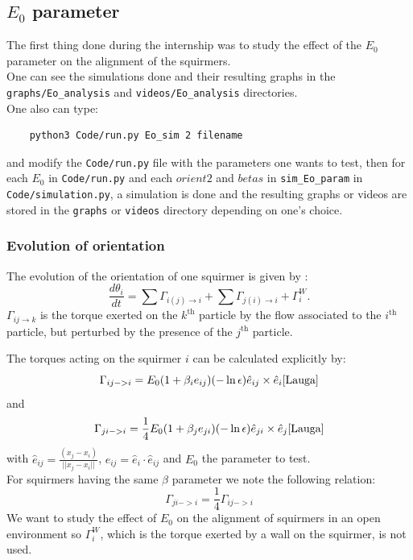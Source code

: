 \documentclass{article}
\begin{document}
\subsection{$E_0$ parameter}
The first thing done during the internship was to study the effect of the $E_0$ parameter on the alignment of the squirmers.\\
One can see the simulations done and their resulting graphs in the \texttt{graphs/Eo\_analysis} and \texttt{videos/Eo\_analysis} directories.\\
One also can type:
\begin{verbatim}
    python3 Code/run.py Eo_sim 2 filename
\end{verbatim}
and modify the \texttt{Code/run.py} file with the parameters one wants to test,
 then for each $E_0$ in \texttt{Code/run.py} and each $orient2$ and $betas$ in \texttt{sim\_Eo\_param} in \texttt{Code/simulation.py}, 
 a simulation is done and the resulting graphs or videos are stored in the \texttt{graphs} or \texttt{videos} 
 directory depending on one's choice.\\

\subsubsection{Evolution of orientation}
The evolution of the orientation of one squirmer is given by : 
$$
\frac{d \theta_i}{dt} = \sum \Gamma_{i(j)\rightarrow i} + \sum \Gamma_{j(i)\rightarrow i} +  \Gamma_{i}^W.
$$
$\Gamma_{ij\rightarrow k}$ is the torque exerted on the $k^\mathrm{th}$ particle by the flow associated to the $i^\mathrm{th}$ particle, but perturbed by the presence of the $j^\mathrm{th}$ particle.\\

\vspace{0.5cm}

The torques acting on the squirmer $i$ can be calculated explicitly by: \\
$$
\Gamma_{ij->i} = E_0(1 + \beta_i e_{ij})(-\ln\epsilon)\hat{e}_{ij}\times \hat{e}_i \cite{Lauga}
$$
and
$$
\Gamma_{ji->i} = \frac{1}{4}E_0(1 + \beta_j e_{ji})(-\ln\epsilon)\hat{e}_{ji}\times \hat{e}_j \cite{Lauga}
$$
with $\hat{e}_{ij} = \frac{(x_j - x_i)}{||x_j - x_i||}$, $e_{ij} = \hat{e}_i\cdot \hat{e}_{ij}$ and $E_0$ the parameter to test.\\ 
For squirmers having the same $\beta$ parameter we note the following relation:
$$
\Gamma_{ji->i} = \frac{1}{4}\Gamma_{ij->i}
$$
We want to study the effect of $E_0$ on the alignment of squirmers in an open environment so $\Gamma_{i}^W$, which is the torque 
exerted by a wall on the squirmer, is not used.
\end{document}
